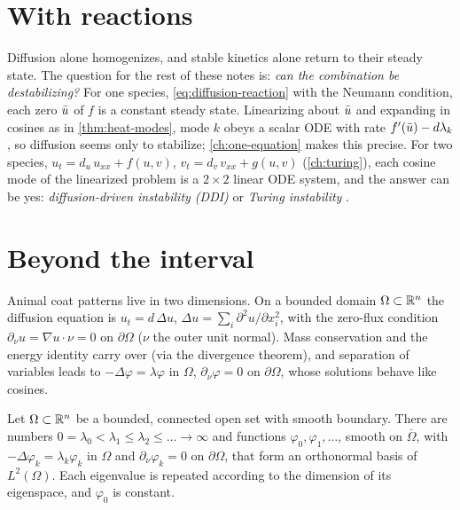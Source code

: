 \section{With reactions}\label{sec:diffusion-reactions}

Diffusion alone homogenizes, and stable kinetics alone return to their steady state.
The question for the rest of these notes is: \emph{can the combination be
destabilizing?} For one species, \eqref{eq:diffusion-reaction} with the Neumann
condition, each zero $\bar u$ of $f$ is a constant steady state. Linearizing about
$\bar u$ and expanding in cosines as in \cref{thm:heat-modes}, mode $k$ obeys a scalar
ODE with rate $f'(\bar u)-d\lambda_k$, so diffusion seems only to stabilize;
\cref{ch:one-equation} makes this precise. For two species, $u_t=d_u\,u_{xx}+f(u,v)$,
$v_t=d_v\,v_{xx}+g(u,v)$ (\cref{ch:turing}), each cosine mode of the linearized
problem is a $2\times2$ linear ODE system, and the answer can be yes:
\emph{diffusion-driven instability (DDI)} or \emph{Turing instability}
\cite{Turing1952}.

\section{Beyond the interval}\label{sec:diffusion-general}

Animal coat patterns live in two dimensions. On a bounded domain $\Omega\subset\mathbb{R}^n$
the diffusion equation is $u_t=d\,\Delta u$, $\Delta u=\sum_{i}\partial^2u/\partial x_i^2$,
with the zero-flux condition $\partial_\nu u=\nabla u\cdot\nu=0$ on $\partial\Omega$
($\nu$ the outer unit normal). Mass conservation and the energy identity carry over
(via the divergence theorem), and separation of variables leads to
$-\Delta\varphi=\lambda\varphi$ in $\Omega$, $\partial_\nu\varphi=0$ on
$\partial\Omega$, whose solutions behave like cosines.

\begin{theorem}\label{thm:neumann-eigen-general}
Let $\Omega\subset\mathbb{R}^n$ be a bounded, connected open set with smooth boundary. There
are numbers $0=\lambda_0<\lambda_1\le\lambda_2\le\dots\to\infty$ and functions
$\varphi_0,\varphi_1,\dots$, smooth on $\overline\Omega$, with
$-\Delta\varphi_k=\lambda_k\varphi_k$ in $\Omega$ and $\partial_\nu\varphi_k=0$ on
$\partial\Omega$, that form an orthonormal basis of $L^2(\Omega)$. Each eigenvalue is
repeated according to the dimension of its eigenspace, and $\varphi_0$ is constant.
\end{theorem}

